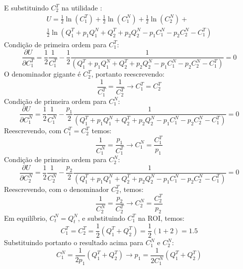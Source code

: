 \documentclass{article}
\begin{document}
E substituindo $C_2^T$ na utilidade :
\begin{equation*}
\begin{split}
    U=\frac{1}{2}\ln (C_1^T) + \frac{1}{2}\ln(C_1^N)+ \frac{1}{2}\ln (C_2^N)+ \\
    \frac{1}{2}\ln (Q_1^T + p_1 Q_1^N + Q_2^T + p_2 Q_2^N - p_1 C_1^N - p_2 C_2^N - C_1^T)
\end{split}
\end{equation*}
Condição de primeira ordem para $C_1^T$:
\begin{equation*}
    \frac{\partial U}{\partial C_1^T} = \frac{1}{2}\frac{1}{C_1^T}-\frac{1}{2}\frac{1}{(Q_1^T + p_1 Q_1^N + Q_2^T + p_2 Q_2^N - p_1 C_1^N - p_2 C_2^N - C_1^T)}=0
\end{equation*}
O denominador gigante é $C_2^T$, portanto reescrevendo:
\begin{equation*}
    \frac{1}{C_1^T}=\frac{1}{C_2^T} \to C_1^T=C_2^T
\end{equation*}
Condição de primeira ordem para $C_1^N$:
\begin{equation*}
    \frac{\partial U}{\partial C_1^N} = \frac{1}{2}\frac{1}{C_1^N}-\frac{p_1}{2}\frac{1}{(Q_1^T + p_1 Q_1^N + Q_2^T + p_2 Q_2^N - p_1 C_1^N - p_2 C_2^N - C_1^T)}=0
\end{equation*}
Reescrevendo, com $C_1^T=C_2^T$ temos:
\begin{equation*}
    \frac{1}{C_1^N}=\frac{p_1}{C_1^T} \to C_1^N = \frac{C_1^T}{p_1}
\end{equation*}
Condição de primeira ordem para $C_2^N$:
\begin{equation*}
    \frac{\partial U}{\partial C_2^N} = \frac{1}{2}\frac{1}{C_2^N}-\frac{p_2}{2}\frac{1}{(Q_1^T + p_1 Q_1^N + Q_2^T + p_2 Q_2^N - p_1 C_1^N - p_2 C_2^N - C_1^T)}=0
\end{equation*}
Reescrevendo, com o denominador $C_2^T$, temos:
\begin{equation*}
    \frac{1}{C_2^N}=\frac{p_2}{C_2^T} \to C_2^N = \frac{C_2^T}{p_2}
\end{equation*}
Em equilíbrio, $C_t^N=Q_t^N$, e substituindo $C_1^T$ na ROI, temos:
\begin{equation*}
    C_1^T = C_2^T = \frac{1}{2}(Q_1^T + Q_2^T) = \frac{1}{2}(1+2)= 1.5
\end{equation*}
Substituindo portanto o resultado acima para $C_1^N$ e $C_2^N$:
\begin{equation*}
    C_1^N = \frac{1}{2p_1}(Q_1^T+Q_2^T) \to p_1=\frac{1}{2C_1^N}(Q_1^T+Q_2^T)
\end{equation*}
\end{document}
